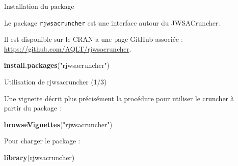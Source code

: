 \documentclass[10pt,xcolor=table,color={dvipsnames,usenames},ignorenonframetext,usepdftitle=false,french]{beamer}
\newenvironment{Shaded}{\begin{snugshade}}{\end{snugshade}}
\newcommand{\KeywordTok}[1]{\textcolor[rgb]{0.13,0.29,0.53}{\textbf{#1}}}
\newcommand{\NormalTok}[1]{#1}
\newcommand{\StringTok}[1]{\textcolor[rgb]{0.31,0.60,0.02}{#1}}
\begin{document}
\begin{frame}[fragile]{Installation du package}
\protect\hypertarget{installation-du-package}{}

Le package \texttt{rjwsacruncher} est une interface autour du
JWSACruncher.

Il est disponible sur le CRAN a une page GitHub associée :
\url{https://github.com/AQLT/rjwsacruncher}.

\begin{Shaded}
\begin{Highlighting}[]
\KeywordTok{install.packages}\NormalTok{(}\StringTok{"rjwsacruncher"}\NormalTok{)}
\end{Highlighting}
\end{Shaded}

\end{frame}

\begin{frame}[fragile]{Utilisation de rjwsacruncher (1/3)}
\protect\hypertarget{utilisation-de-rjwsacruncher-13}{}

Une vignette décrit plus précisément la procédure pour utiliser le
cruncher à partir du package :

\begin{Shaded}
\begin{Highlighting}[]
\KeywordTok{browseVignettes}\NormalTok{(}\StringTok{"rjwsacruncher"}\NormalTok{)}
\end{Highlighting}
\end{Shaded}

Pour charger le package :

\begin{Shaded}
\begin{Highlighting}[]
\KeywordTok{library}\NormalTok{(rjwsacruncher)}
\end{Highlighting}
\end{Shaded}

\end{frame}
\end{document}

